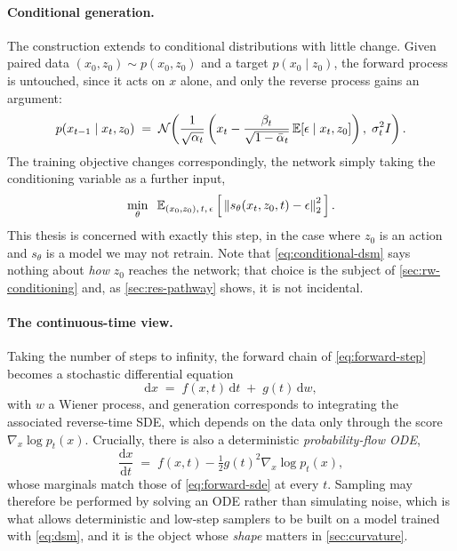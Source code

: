 \paragraph{Conditional generation.} The construction extends to conditional
distributions with little change. Given paired data
$(x_0, z_0) \sim p(x_0, z_0)$ and a target $p(x_0 \mid z_0)$, the forward
process is untouched, since it acts on $x$ alone, and only the reverse
process gains an argument:
\begin{equation}
  p(x_{t-1} \mid x_t, z_0) \;=\; \mathcal{N}\!\left(\frac{1}{\sqrt{\alpha_t}}\left(x_t - \frac{\beta_t}{\sqrt{1-\bar{\alpha}_t}}\,\mathbb{E}\!\left[\epsilon \mid x_t, z_0\right]\right),\; \sigma_t^2 I\right).
\end{equation}
The training objective changes correspondingly, the network simply taking
the conditioning variable as a further input,
\begin{equation}
  \label{eq:conditional-dsm}
  \min_\theta \;\; \mathbb{E}_{(x_0,z_0),\,t,\,\epsilon}
  \left[\, \left\lVert s_\theta(x_t, z_0, t) - \epsilon \right\rVert_2^2 \,\right].
\end{equation}
This thesis is concerned with exactly this step, in the case where $z_0$ is
an action and $s_\theta$ is a model we may not retrain. Note that
\cref{eq:conditional-dsm} says nothing about \emph{how} $z_0$ reaches the
network; that choice is the subject of \cref{sec:rw-conditioning} and, as
\cref{sec:res-pathway} shows, it is not incidental.

\paragraph{The continuous-time view.} Taking the number of steps to
infinity, the forward chain of \cref{eq:forward-step} becomes a stochastic
differential equation~\citep{song2021sde}
\begin{equation}
  \label{eq:forward-sde}
  \mathrm{d}x \;=\; f(x,t)\,\mathrm{d}t \;+\; g(t)\,\mathrm{d}w,
\end{equation}
with $w$ a Wiener process, and generation corresponds to integrating the
associated reverse-time SDE, which depends on the data only through the
score $\nabla_x \log p_t(x)$. Crucially, there is also a deterministic
\emph{probability-flow ODE},
\begin{equation}
  \label{eq:pf-ode}
  \frac{\mathrm{d}x}{\mathrm{d}t} \;=\; f(x,t) - \tfrac{1}{2}g(t)^2 \nabla_x \log p_t(x),
\end{equation}
whose marginals match those of \cref{eq:forward-sde} at every $t$. Sampling
may therefore be performed by solving an ODE rather than simulating noise,
which is what allows deterministic and low-step samplers to be built on a
model trained with \cref{eq:dsm}, and it is the object whose \emph{shape}
matters in \cref{sec:curvature}.

